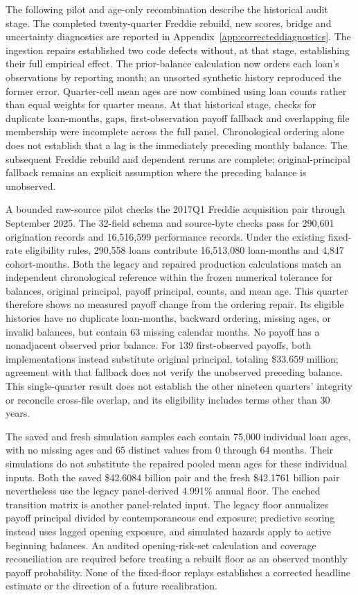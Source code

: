 The following pilot and age-only recombination describe the historical audit stage. The completed twenty-quarter Freddie rebuild, new scores, bridge and uncertainty diagnostics are reported in Appendix~\ref{app:correcteddiagnostics}. The ingestion repairs established two code defects without, at that stage, establishing their full empirical effect. The prior-balance calculation now orders each loan's observations by reporting month; an unsorted synthetic history reproduced the former error. Quarter-cell mean ages are now combined using loan counts rather than equal weights for quarter means. At that historical stage, checks for duplicate loan-months, gaps, first-observation payoff fallback and overlapping file membership were incomplete across the full panel. Chronological ordering alone does not establish that a lag is the immediately preceding monthly balance. The subsequent Freddie rebuild and dependent reruns are complete; original-principal fallback remains an explicit assumption where the preceding balance is unobserved.

A bounded raw-source pilot checks the 2017Q1 Freddie acquisition pair through September 2025. The 32-field schema and source-byte checks pass for 290,601 origination records and 16,516,599 performance records. Under the existing fixed-rate eligibility rules, 290,558 loans contribute 16,513,080 loan-months and 4,847 cohort-months. Both the legacy and repaired production calculations match an independent chronological reference within the frozen numerical tolerance for balances, original principal, payoff principal, counts, and mean age. This quarter therefore shows no measured payoff change from the ordering repair. Its eligible histories have no duplicate loan-months, backward ordering, missing ages, or invalid balances, but contain 63 missing calendar months. No payoff has a nonadjacent observed prior balance. For 139 first-observed payoffs, both implementations instead substitute original principal, totaling \$33.659 million; agreement with that fallback does not verify the unobserved preceding balance. This single-quarter result does not establish the other nineteen quarters' integrity or reconcile cross-file overlap, and its eligibility includes terms other than 30 years.

The saved and fresh simulation samples each contain 75,000 individual loan ages, with no missing ages and 65 distinct values from 0 through 64 months. Their simulations do not substitute the repaired pooled mean ages for these individual inputs. Both the saved \$42.6084 billion pair and the fresh \$42.1761 billion pair nevertheless use the legacy panel-derived 4.991\% annual floor. The cached transition matrix is another panel-related input. The legacy floor annualizes payoff principal divided by contemporaneous end exposure; predictive scoring instead uses lagged opening exposure, and simulated hazards apply to active beginning balances. An audited opening-risk-set calculation and coverage reconciliation are required before treating a rebuilt floor as an observed monthly payoff probability. None of the fixed-floor replays establishes a corrected headline estimate or the direction of a future recalibration.

